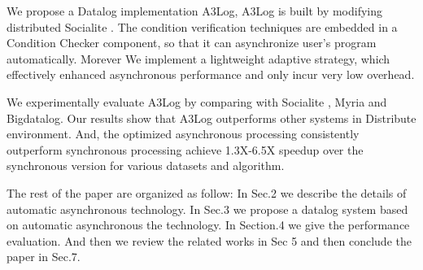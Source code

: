 \begin{itemize}
{	\item We propose a Datalog implementation A3Log, A3Log is built by modifying distributed Socialite \cite{Seo:2013:DSD:2556549.2556572}. The condition verification techniques are embedded in a Condition Checker component, so that it can asynchronize user's program automatically. Morever We implement a lightweight adaptive strategy, which effectively enhanced asynchronous performance and only incur very low overhead.
	
	\item We experimentally evaluate A3Log by comparing with Socialite\cite{Lam:2013:SDE:2510649.2511289} , %
	 Myria\cite{Wang:2015:AFR:2824032.2824052} and Bigdatalog\cite{Shkapsky:2016:BDA:2882903.2915229}.
	 Our results show that A3Log outperforms other systems in Distribute environment. And, the optimized asynchronous processing consistently outperform synchronous processing achieve 1.3X-6.5X speedup over the synchronous version for various datasets and algorithm. 
	}
\end{itemize}

The rest of the paper are organized as follow: In Sec.2 we describe the details of  automatic asynchronous technology. In Sec.3 we propose a datalog system based on automatic asynchronous the technology. In Section.4  we give the performance evaluation. And then we review the related works in Sec 5 and then conclude the paper in Sec.7.


